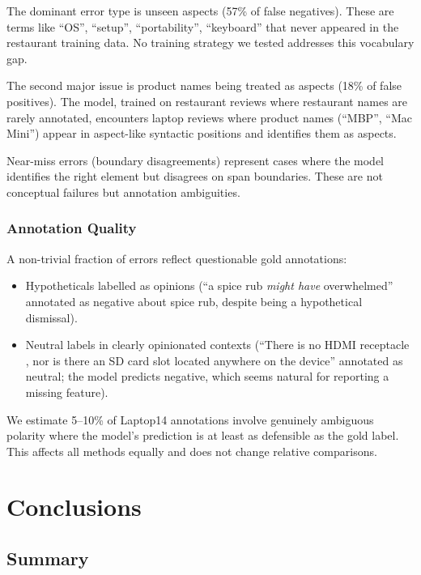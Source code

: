\documentclass[12pt,a4paper]{report}
\begin{document}
The dominant error type is unseen aspects (57\% of false negatives). These are terms like ``OS'', ``setup'', ``portability'', ``keyboard'' that never appeared in the restaurant training data. No training strategy we tested addresses this vocabulary gap.

The second major issue is product names being treated as aspects (18\% of false positives). The model, trained on restaurant reviews where restaurant names are rarely annotated, encounters laptop reviews where product names (``MBP'', ``Mac Mini'') appear in aspect-like syntactic positions and identifies them as aspects.

Near-miss errors (boundary disagreements) represent cases where the model identifies the right element but disagrees on span boundaries. These are not conceptual failures but annotation ambiguities.

\subsection{Annotation Quality}

A non-trivial fraction of errors reflect questionable gold annotations:

\begin{itemize}
    \item Hypotheticals labelled as opinions (``a spice rub \textit{might have} overwhelmed'' annotated as negative about spice rub, despite being a hypothetical dismissal).
    \item Neutral labels in clearly opinionated contexts (``There is no HDMI receptacle , nor is there an SD card slot located anywhere on the device'' annotated as neutral; the model predicts negative, which seems natural for reporting a missing feature).
\end{itemize}

We estimate 5--10\% of Laptop14 annotations involve genuinely ambiguous polarity where the model's prediction is at least as defensible as the gold label. This affects all methods equally and does not change relative comparisons.



\chapter{Conclusions}\label{ch:conclusions}

\section{Summary}
\end{document}
